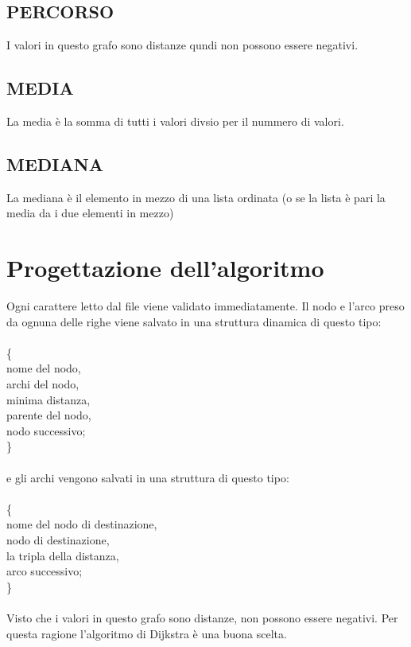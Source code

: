 \documentclass[11pt, a4paper, titlepage, block]{article}
\begin{document}
	\subsection{PERCORSO}
	I valori in questo grafo sono distanze qundi non possono essere negativi.
	\subsection{MEDIA}
	La media \`{e} la somma di tutti i valori divsio per il nummero di valori.
	\subsection{MEDIANA}
	La mediana \`{e} il elemento in mezzo di una lista ordinata (o se la lista \`{e} pari la media da i due elementi in mezzo)\\

	\newpage
\section{Progettazione dell'algoritmo}
	Ogni carattere letto dal file viene validato immediatamente. Il nodo e l'arco preso da ognuna delle righe viene salvato in una struttura dinamica di questo tipo: \\\\
	\{\\
	\indent nome del nodo,\\
	\indent archi del nodo,\\
	\indent minima distanza,\\
	\indent parente del nodo,\\
	\indent nodo successivo; \\
	\}\\\\
	e gli archi vengono salvati in una struttura di questo tipo:\\\\
	\{\\
	\indent nome del nodo di destinazione,\\
	\indent nodo di destinazione,\\
	\indent la tripla della distanza,\\
	\indent arco successivo;\\
	\}\\\\

	Visto che i valori in questo grafo sono distanze, non possono essere negativi. Per questa ragione l'algoritmo di Dijkstra \`{e} una buona scelta.\\\\
\end{document}
